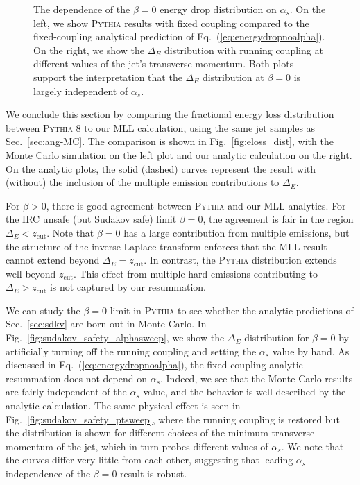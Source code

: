 \documentclass[letterpaper,11pt]{article}
\newcommand{\as}{\alpha_s}
\newcommand{\zcut}{z_\text{cut}}
\DeclareRobustCommand{\Sec}[1]{Sec.~\ref{#1}}
\DeclareRobustCommand{\Fig}[1]{Fig.~\ref{#1}}
\DeclareRobustCommand{\Eq}[1]{Eq.~(\ref{#1})}
\newcommand{\pythia}[1]{\textsc{Pythia\xspace #1}}
\begin{document}
\begin{figure}[]
\begin{center}
$\quad$
\end{center}
\caption{The dependence of the $\beta=0$ energy drop distribution on $\alpha_s$.  On the left, we show \pythia{} results with fixed coupling compared to the fixed-coupling analytical prediction of \Eq{eq:energydropnoalpha}.  On the right, we show the $\Delta_E$ distribution with running coupling at different values of the jet's transverse momentum.  Both plots support the interpretation that the $\Delta_E$ distribution at $\beta=0$ is largely independent of $\alpha_s$.}
\label{fig:sudakov_safety}
\end{figure}

We conclude this section by comparing the fractional energy loss distribution between \pythia{8} to our MLL calculation, using the same jet samples as \Sec{sec:ang-MC}. The comparison is shown in \Fig{fig:eloss_dist}, with the Monte Carlo simulation on the left plot and our analytic calculation on the right.  On the analytic plots, the solid (dashed) curves represent the result with (without) the inclusion of the multiple emission contributions to $\Delta_E$. 

For $\beta>0$, there is good agreement between \pythia{} and our MLL analytics.  For the IRC unsafe (but Sudakov safe) limit $\beta=0$, the agreement is fair in the region $\Delta_E<\zcut$.  Note that $\beta = 0$ has a large contribution from multiple emissions, but the structure of the inverse Laplace transform enforces that the MLL result cannot extend beyond $\Delta_E = \zcut$.  In contrast, the \pythia{} distribution extends well beyond $\zcut$.  This effect from multiple hard emissions contributing to $\Delta_E > \zcut$ is not captured by our resummation. 

We can study the $\beta = 0$ limit in \pythia{} to see whether the analytic predictions of \Sec{sec:sdkv} are born out in Monte Carlo.  In \Fig{fig:sudakov_safety_alphasweep}, we show the $\Delta_E$ distribution for $\beta=0$ by artificially turning off the running coupling and setting the $\alpha_s$ value by hand.  As discussed in \Eq{eq:energydropnoalpha}, the fixed-coupling analytic resummation does not depend on $\as$. Indeed, we see that the Monte Carlo results are fairly independent of the $\alpha_s$ value, and the behavior is well described by the analytic calculation.  The same physical effect is seen in \Fig{fig:sudakov_safety_ptsweep}, where the running coupling is restored but the distribution is shown for different choices of the minimum transverse momentum of the jet, which in turn probes different values of $\alpha_s$.  We note that the curves differ very little from each other, suggesting that leading $\alpha_s$-independence of the $\beta = 0$ result is robust.
\end{document}
